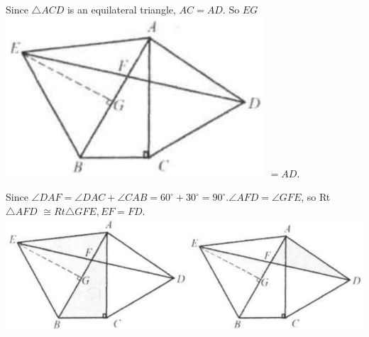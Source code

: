 \documentclass[10pt]{article}
\begin{document}
Since \(\triangle A C D\) is an equilateral triangle, \(A C=A D\). So \(E G\)\\
\includegraphics[max width=\textwidth]{2025_04_17_97bc1f7e44d93c271a88g-098} \(=A D\).

Since \(\angle D A F=\angle D A C+\angle C A B=60^{\circ}+30^{\circ}=90^{\circ} . \angle A F D=\angle G F E\), so Rt \(\triangle A F D\) \(\cong R t \triangle G F E, E F=F D\).\\
\includegraphics[max width=\textwidth, center]{2025_04_17_97bc1f7e44d93c271a88g-098(1)}
\end{document}
